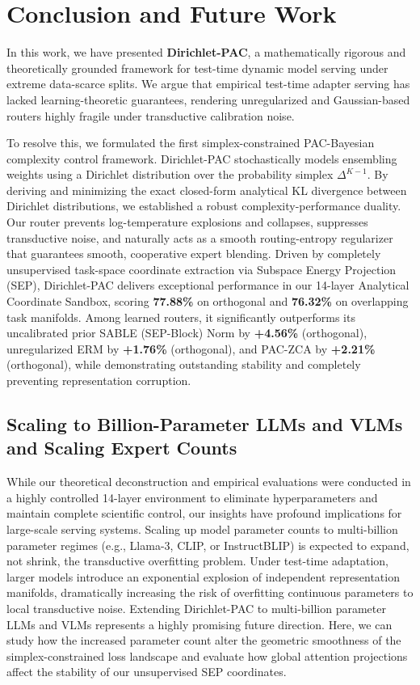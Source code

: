 \section{Conclusion and Future Work}
\label{sec:conclusion}

In this work, we have presented \textbf{Dirichlet-PAC}, a mathematically rigorous and theoretically grounded framework for test-time dynamic model serving under extreme data-scarce splits. We argue that empirical test-time adapter serving has lacked learning-theoretic guarantees, rendering unregularized and Gaussian-based routers highly fragile under transductive calibration noise. 

To resolve this, we formulated the first simplex-constrained PAC-Bayesian complexity control framework. Dirichlet-PAC stochastically models ensembling weights using a Dirichlet distribution over the probability simplex $\Delta^{K-1}$. By deriving and minimizing the exact closed-form analytical KL divergence between Dirichlet distributions, we established a robust complexity-performance duality. Our router prevents log-temperature explosions and collapses, suppresses transductive noise, and naturally acts as a smooth routing-entropy regularizer that guarantees smooth, cooperative expert blending. Driven by completely unsupervised task-space coordinate extraction via Subspace Energy Projection (SEP), Dirichlet-PAC delivers exceptional performance in our 14-layer Analytical Coordinate Sandbox, scoring \textbf{77.88\%} on orthogonal and \textbf{76.32\%} on overlapping task manifolds. Among learned routers, it significantly outperforms its uncalibrated prior SABLE (SEP-Block) Norm by \textbf{+4.56\%} (orthogonal), unregularized ERM by \textbf{+1.76\%} (orthogonal), and PAC-ZCA by \textbf{+2.21\%} (orthogonal), while demonstrating outstanding stability and completely preventing representation corruption.

\subsection{Scaling to Billion-Parameter LLMs and VLMs and Scaling Expert Counts}
While our theoretical deconstruction and empirical evaluations were conducted in a highly controlled 14-layer environment to eliminate hyperparameters and maintain complete scientific control, our insights have profound implications for large-scale serving systems. Scaling up model parameter counts to multi-billion parameter regimes (e.g., Llama-3, CLIP, or InstructBLIP) is expected to expand, not shrink, the transductive overfitting problem. Under test-time adaptation, larger models introduce an exponential explosion of independent representation manifolds, dramatically increasing the risk of overfitting continuous parameters to local transductive noise. Extending Dirichlet-PAC to multi-billion parameter LLMs and VLMs represents a highly promising future direction. Here, we can study how the increased parameter count alter the geometric smoothness of the simplex-constrained loss landscape and evaluate how global attention projections affect the stability of our unsupervised SEP coordinates.

